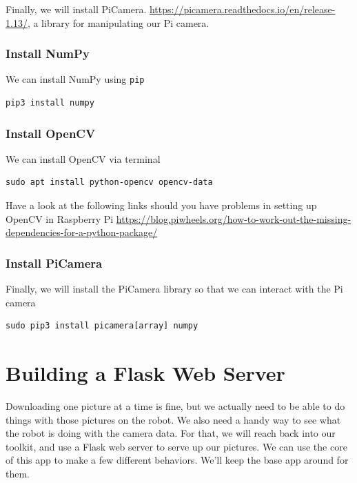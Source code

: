 Finally, we will install PiCamera. \url{https://picamera.readthedocs.io/en/release-1.13/}, a library for manipulating our Pi camera.


\subsubsection{Install NumPy}

We can install NumPy using \lstinline{pip}

\begin{lstlisting}
pip3 install numpy
\end{lstlisting}

\subsubsection{Install OpenCV}

We can install OpenCV via terminal

\begin{lstlisting}
sudo apt install python-opencv opencv-data
\end{lstlisting}

\begin{framed}
\begin{remark}

Have a look at the following links should you have problems in setting up OpenCV in Raspberry Pi
\url{https://blog.piwheels.org/how-to-work-out-the-missing-dependencies-for-a-python-package/}
\end{remark}
\end{framed}

\subsubsection{Install PiCamera}

Finally, we will install the PiCamera library so that we can interact with the Pi camera

\begin{lstlisting}
sudo pip3 install picamera[array] numpy
\end{lstlisting}

\section{Building a Flask Web Server}

Downloading one picture at a time is fine, but we actually need to be able to do things with
those pictures on the robot. We also need a handy way to see what the robot is doing with
the camera data. For that, we will reach back into our toolkit, and use a Flask web server to
serve up our pictures. We can use the core of this app to make a few different behaviors.
We'll keep the base app around for them.

